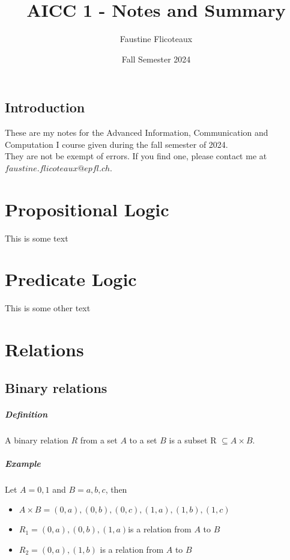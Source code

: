\documentclass[10pt,a4paper]{book}
\title{AICC 1 - Notes and Summary}
\author{Faustine Flicoteaux}
\date{Fall Semester 2024}
\begin{document}
\maketitle

\pagebreak

\section*{Introduction}

These are my notes for the Advanced Information, Communication and Computation I course given during the fall semester of 2024.\\
They are not be exempt of errors. If you find one, please contact me at $faustine.flicoteaux@epfl.ch$.


\chapter{Propositional Logic}

This is some text

\chapter{Predicate Logic}

This is some other text

\chapter{Relations}

\section{Binary relations}

\paragraph*{Definition}
A binary relation $R$ from a set $A$ to a set $B$ is a subset R $\subseteq A \times B$.

\paragraph*{Example}
Let $A = {0,1}$ and $B = {a,b,c}$, then
\begin{itemize}
\item $A \times B ={(0, a),(0, b),(0, c),(1, a), (1, b), (1, c)}$
\item $R_1 ={(0, a), (0, b), (1, a)}$is a relation from $A$ to $B$
\item $R_2 ={(0, a), (1,b)}$ is a relation from $A$ to $B$
\end{itemize}
\end{document}
